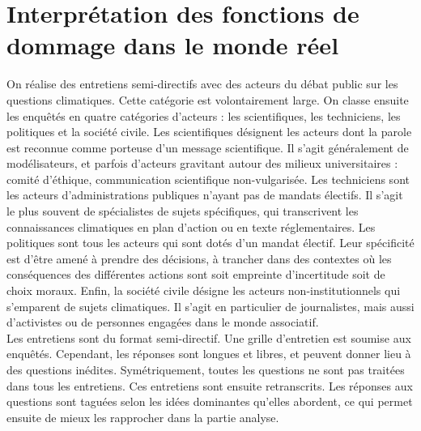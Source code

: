 \chapter{Interprétation des fonctions de dommage dans le monde réel}
\label{chapter:socio}





\begin{methodbox}

On réalise des entretiens semi-directifs avec des acteurs du débat public sur les questions climatiques. Cette catégorie est volontairement large. On classe ensuite les enquêtés en quatre catégories d'acteurs : les scientifiques, les techniciens, les politiques et la société civile. Les scientifiques désignent les acteurs dont la parole est reconnue comme porteuse d'un message scientifique. Il s'agit généralement de modélisateurs, et parfois d'acteurs gravitant autour des milieux universitaires : comité d'éthique, communication scientifique non-vulgarisée. Les techniciens sont les acteurs d'administrations publiques n'ayant pas de mandats électifs. Il s'agit le plus souvent de spécialistes de sujets spécifiques, qui transcrivent les connaissances climatiques en plan d'action ou en texte réglementaires. Les politiques sont tous les acteurs qui sont dotés d'un mandat électif. Leur spécificité est d'être amené à prendre des décisions, à trancher dans des contextes où les conséquences des différentes actions sont soit empreinte d'incertitude soit de choix moraux. Enfin, la société civile désigne les acteurs non-institutionnels qui s'emparent de sujets climatiques. Il s'agit en particulier de journalistes, mais aussi d'activistes ou de personnes engagées dans le monde associatif. \\

Les entretiens sont du format semi-directif. Une grille d'entretien est soumise aux enquêtés. Cependant, les réponses sont longues et libres, et peuvent donner lieu à des questions inédites. Symétriquement, toutes les questions ne sont pas traitées dans tous les entretiens. Ces entretiens sont ensuite retranscrits. Les réponses aux questions sont taguées selon les idées dominantes qu'elles abordent, ce qui permet ensuite de mieux les rapprocher dans la partie analyse. 


\end{methodbox}


